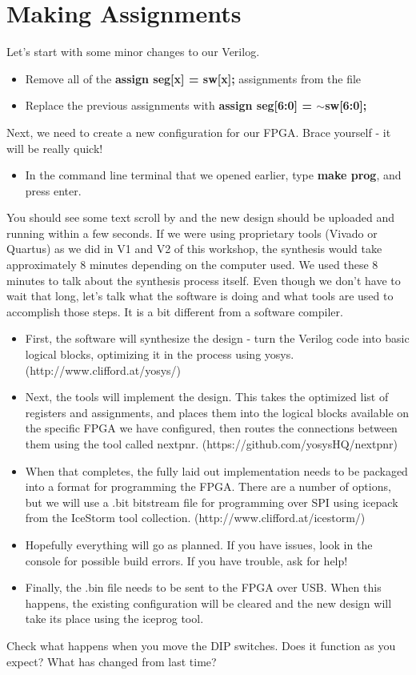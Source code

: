 \documentclass[12pt,a4paper]{article}
\begin{document}
\section{Making Assignments}
Let’s start with some minor changes to our Verilog.
\begin{itemize}
	\item Remove all of the \textbf{assign seg[x] = sw[x];} assignments from the file 
	\item Replace the previous assignments with \textbf{assign seg[6:0] = $\sim$sw[6:0];}
\end{itemize}
\noindent
Next, we need to create a new configuration for our FPGA. Brace yourself - it will be really quick!
\begin{itemize}
	\item In the command line terminal that we opened earlier, type \textbf{make prog}, and press enter. 
\end{itemize}
\noindent
You should see some text scroll by and the new design should be uploaded and running within a few seconds. If we were using proprietary tools (Vivado or Quartus) as we did in V1 and V2 of this workshop, the synthesis would take approximately 8 minutes depending on the computer used. We used these 8 minutes to talk about the synthesis process itself. Even though we don’t have to wait that long, let’s talk what the software is doing and what tools are used to accomplish those steps. It is a bit different from a software compiler.

\begin{itemize}
	\item First, the software will synthesize the design - turn the Verilog code into basic logical blocks, optimizing it in the process using yosys. (http://www.clifford.at/yosys/)
	\item Next, the tools will implement the design. This takes the optimized list of registers and assignments, and places them into the logical blocks available on the specific FPGA we have configured, then routes the connections between them using the tool called nextpnr. (https://github.com/yosysHQ/nextpnr)
	\item When that completes, the fully laid out 	implementation needs to be packaged into a 	format for programming the FPGA. There are a 	number of options, but we will use a .bit bitstream file for programming over SPI using icepack from the IceStorm tool collection.
	(http://www.clifford.at/icestorm/)
	\item Hopefully everything will go as planned. If you have issues, look in the console for possible build errors. If you have trouble, ask for help!
	\item Finally, the .bin file needs to be sent to the FPGA over USB. When this happens, the existing configuration will be cleared and the new design will take its place using the iceprog tool.
\end{itemize}
\noindent
Check what happens when you move the DIP switches. Does it function as you expect? What has changed from last time?
\end{document}
